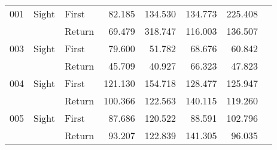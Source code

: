 \begin{table}[!htb]
\begin{tabular}{lllrrrrr}
001 & Sight & First &  82.185 &                                                134.530 &                                                 134.773 &  225.408 \\
    &       & Return &  69.479 &                                                318.747 &                                                 116.003 &  136.507 \\
003 & Sight & First &  79.600 &                                                 51.782 &                                                  68.676 &   60.842 \\
    &       & Return &  45.709 &                                                 40.927 &                                                  66.323 &   47.823 \\
004 & Sight & First & 121.130 &                                                154.718 &                                                 128.477 &  125.947 \\
    &       & Return & 100.366 &                                                122.563 &                                                 140.115 &  119.260 \\
005 & Sight & First &  87.686 &                                                120.522 &                                                  88.591 &  102.796 \\
    &       & Return &  93.207 &                                                122.839 &                                                 141.305 &   96.035 \\
\bottomrule
\end{tabular}
\end{table}

